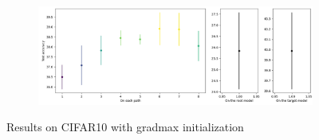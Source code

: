 \documentclass{article}
\begin{document}
\begin{figure}[htbp]
    \vspace{0.5cm}
    
    \begin{subfigure}[b]{0.5\textwidth}
        \centering
        \includegraphics[width=\textwidth]{imgs/statistical_reliability_CIFAR10_gradmax_2024_05_02_16_13_51.png}
    \end{subfigure}
    \caption{Results on CIFAR10 with gradmax initialization}
\end{figure}
\end{document}
